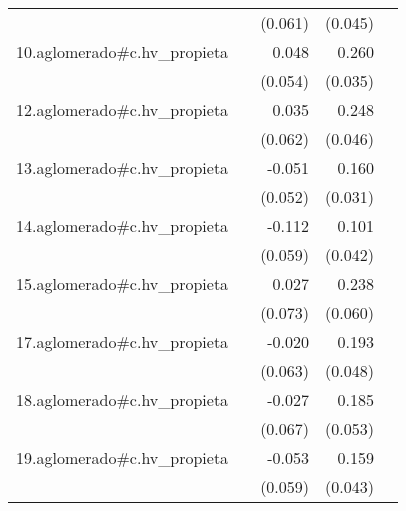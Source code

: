 {\begin{longtable}{l*{4}{D{.}{.}{-1}}}
            &                     &     (0.061)         &     (0.045)         &                     \\
\addlinespace
10.aglomerado#c.hv\_propieta&                     &       0.048         &       0.260\sym{***}&                     \\
            &                     &     (0.054)         &     (0.035)         &                     \\
\addlinespace
12.aglomerado#c.hv\_propieta&                     &       0.035         &       0.248\sym{***}&                     \\
            &                     &     (0.062)         &     (0.046)         &                     \\
\addlinespace
13.aglomerado#c.hv\_propieta&                     &      -0.051         &       0.160\sym{***}&                     \\
            &                     &     (0.052)         &     (0.031)         &                     \\
\addlinespace
14.aglomerado#c.hv\_propieta&                     &      -0.112         &       0.101\sym{*}  &                     \\
            &                     &     (0.059)         &     (0.042)         &                     \\
\addlinespace
15.aglomerado#c.hv\_propieta&                     &       0.027         &       0.238\sym{***}&                     \\
            &                     &     (0.073)         &     (0.060)         &                     \\
\addlinespace
17.aglomerado#c.hv\_propieta&                     &      -0.020         &       0.193\sym{***}&                     \\
            &                     &     (0.063)         &     (0.048)         &                     \\
\addlinespace
18.aglomerado#c.hv\_propieta&                     &      -0.027         &       0.185\sym{***}&                     \\
            &                     &     (0.067)         &     (0.053)         &                     \\
\addlinespace
19.aglomerado#c.hv\_propieta&                     &      -0.053         &       0.159\sym{***}&                     \\
            &                     &     (0.059)         &     (0.043)         &                     \\

\end{longtable}}
